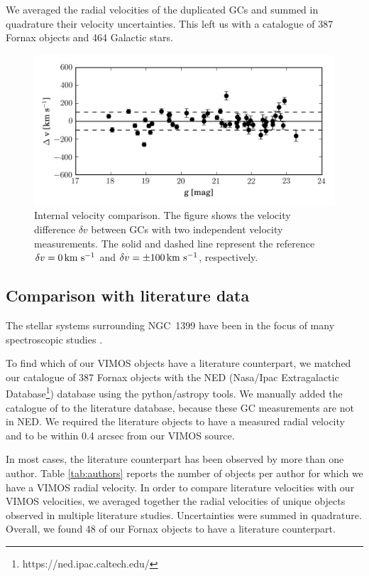 \documentclass[useAMS,usenatbib]{mn2e}
\newcommand{\kms}{\mbox{\,km~s$^{-1}$}}
\begin{document}
We averaged the radial velocities of the duplicated GCs and summed in 
quadrature their velocity uncertainties. This left us with a catalogue of 387 
Fornax objects and 464 Galactic stars.

\begin{figure}
\centering
\includegraphics[width=\columnwidth]{figures/internal.png} 
\caption{Internal velocity comparison. The figure shows the velocity difference 
$\delta v$ between GCs with two independent velocity measurements. The solid 
and dashed line represent the reference $\delta v = 0 \kms$ and $\delta v = \pm 100 \kms$, respectively. }
\label{fig:internal}
\end{figure}

\subsection{Comparison with literature data}\label{sec:compar}

The stellar systems surrounding NGC~1399 have been in the focus of many 
spectroscopic studies
\citep{Dirsch04, Schuberth, Bergond07, Firth07, Chilingarian11, Mieske04, 
Hilker07, Francis12, Drinkwater00}.

To find which of our VIMOS objects have a literature counterpart, we matched 
our catalogue of 387 Fornax objects with the NED (Nasa/Ipac Extragalactic 
Database\footnote{https://ned.ipac.caltech.edu/}) database using the 
python/astropy tools. 
We manually added the catalogue of \citet{Schuberth} to the literature 
database, because these GC measurements are not in NED. We required the 
literature objects to have a measured radial velocity and to be within 0.4 
arcsec from our VIMOS source. 

In most cases, the literature counterpart has been observed by more than one 
author. Table \ref{tab:authors} reports the number of objects per author for 
which we have a VIMOS radial velocity. 
In order to compare literature velocities with our VIMOS velocities, we 
averaged together the radial velocities of unique objects observed in multiple 
literature studies. Uncertainties were summed in quadrature. 
Overall, we found 48 of our Fornax objects to have a literature counterpart. 
\end{document}
